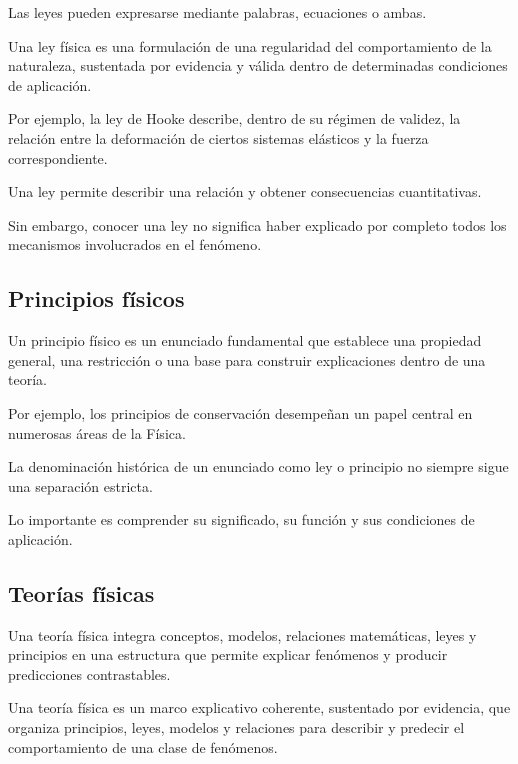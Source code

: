 Las leyes pueden expresarse mediante palabras,
ecuaciones o ambas.

\begin{definicion}

Una ley física es una formulación de una regularidad
del comportamiento de la naturaleza, sustentada
por evidencia y válida dentro de determinadas
condiciones de aplicación.

\end{definicion}

Por ejemplo, la ley de Hooke describe,
dentro de su régimen de validez,
la relación entre la deformación de ciertos
sistemas elásticos y la fuerza correspondiente.

Una ley permite describir una relación
y obtener consecuencias cuantitativas.

Sin embargo, conocer una ley no significa
haber explicado por completo todos
los mecanismos involucrados en el fenómeno.


\subsection{Principios físicos}

Un principio físico es un enunciado fundamental
que establece una propiedad general,
una restricción o una base para construir
explicaciones dentro de una teoría.

Por ejemplo, los principios de conservación
desempeñan un papel central en numerosas
áreas de la Física.

La denominación histórica de un enunciado
como ley o principio no siempre sigue
una separación estricta.

Lo importante es comprender su significado,
su función y sus condiciones de aplicación.


\subsection{Teorías físicas}

Una teoría física integra conceptos,
modelos, relaciones matemáticas,
leyes y principios en una estructura
que permite explicar fenómenos
y producir predicciones contrastables.

\begin{definicion}

Una teoría física es un marco explicativo
coherente, sustentado por evidencia,
que organiza principios, leyes, modelos
y relaciones para describir y predecir
el comportamiento de una clase de fenómenos.

\end{definicion}

